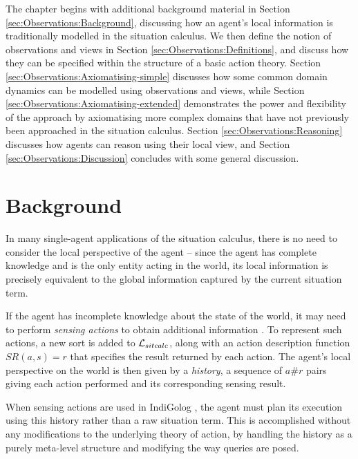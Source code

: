 The chapter begins with additional background material in Section
\ref{sec:Observations:Background}, discussing how an agent's local
information is traditionally modelled in the situation calculus. We
then define the notion of observations and views in Section \ref{sec:Observations:Definitions},
and discuss how they can be specified within the structure of a basic
action theory. Section \ref{sec:Observations:Axiomatising-simple}
discusses how some common domain dynamics can be modelled using observations
and views, while Section \ref{sec:Observations:Axiomatising-extended}
demonstrates the power and flexibility of the approach by axiomatising
more complex domains that have not previously been approached in the
situation calculus. Section \ref{sec:Observations:Reasoning} discusses
how agents can reason using their local view, and Section \ref{sec:Observations:Discussion}
concludes with some general discussion.


\section{Background\label{sec:Observations:Background}}

In many single-agent applications of the situation calculus, there
is no need to consider the local perspective of the agent -- since
the agent has complete knowledge and is the only entity acting in
the world, its local information is precisely equivalent to the global
information captured by the current situation term.

If the agent has incomplete knowledge about the state of the world,
it may need to perform \emph{sensing actions} to obtain additional
information \citep{giacomo99indigolog,scherl03sc_knowledge}. To represent
such actions, a new sort is added to $\mathcal{L}_{sitcalc}$, along
with an action description function $SR(a,s)=r$ that specifies the
result returned by each action. The agent's local perspective on the
world is then given by a \emph{history}, a sequence of $a\#r$ pairs
giving each action performed and its corresponding sensing result.

When sensing actions are used in IndiGolog \citep{giacomo99indigolog},
the agent must plan its execution using this history rather than a
raw situation term. This is accomplished without any modifications
to the underlying theory of action, by handling the history as a purely
meta-level structure and modifying the way queries are posed.

